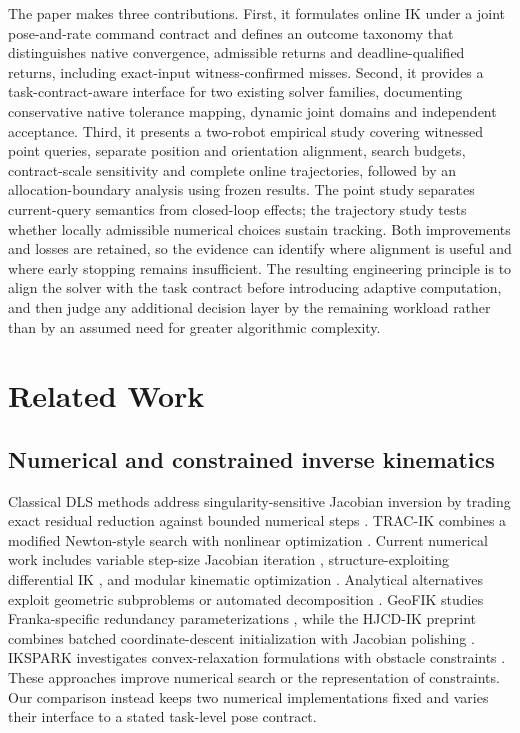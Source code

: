 \documentclass[10pt,a4paper]{article}
\begin{document}
The paper makes three contributions. First, it formulates online IK under a
joint pose-and-rate command contract and defines an outcome taxonomy that
distinguishes native convergence, admissible returns and deadline-qualified
returns, including exact-input witness-confirmed misses. Second, it provides
a task-contract-aware interface for two existing solver families, documenting
conservative native tolerance mapping, dynamic joint domains and independent
acceptance. Third, it presents a two-robot empirical study covering witnessed
point queries, separate position and orientation alignment, search budgets,
contract-scale sensitivity and complete online trajectories, followed by an
allocation-boundary analysis using frozen results. The point study separates
current-query semantics from closed-loop effects; the trajectory study tests
whether locally admissible numerical choices sustain tracking. Both improvements
and losses are retained, so the evidence can identify where alignment is useful
and where early stopping remains insufficient. The resulting engineering
principle is to align the solver with the task contract before introducing
adaptive computation, and then judge any additional decision layer by the
remaining workload rather than by an assumed need for greater algorithmic
complexity.

\section{Related Work}
\label{sec:related}

\subsection{Numerical and constrained inverse kinematics}

Classical DLS methods address singularity-sensitive Jacobian inversion by trading
exact residual reduction against bounded numerical steps
\cite{wampler1986dls,nakamura1986singularity,chiaverini1994review}.
TRAC-IK combines a modified Newton-style search with nonlinear optimization
\cite{beeson2015tracik}. Current numerical work includes variable step-size
Jacobian iteration \cite{colan2024variablestep}, structure-exploiting differential
IK \cite{wingo2024linear}, and modular kinematic optimization
\cite{kim2025pyroki}. Analytical alternatives exploit geometric subproblems or
automated decomposition \cite{elias2025ikgeo,ostermeier2025eaik}.
GeoFIK studies Franka-specific redundancy parameterizations
\cite{lopezcustodio2025geofik}, while the HJCD-IK preprint combines batched
coordinate-descent initialization with Jacobian polishing
\cite{yasutake2026hjcdik}. IKSPARK investigates convex-relaxation formulations
with obstacle constraints \cite{wu2024ikspark}.
These approaches improve numerical search or the representation of constraints.
Our comparison instead keeps two numerical implementations fixed and varies
their interface to a stated task-level pose contract.
\end{document}
